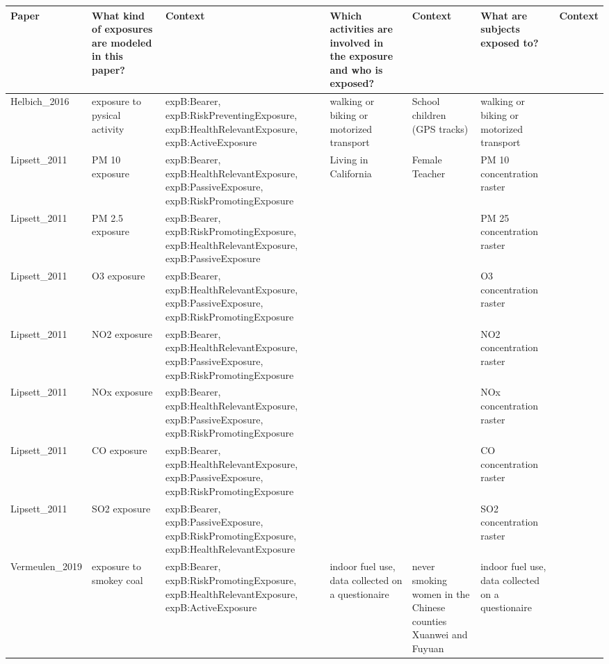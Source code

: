 \begin{tabular}{p{1cm}p{1cm}p{1cm}p{1cm}p{1cm}p{1cm}p{1cm}}
\toprule
          Paper & What kind of exposures are modeled in this paper? &                                                                                                         Context & Which activities are involved in the exposure and who is exposed? &                                                        Context &                     What are subjects exposed to? & Context \\
\midrule
Helbich\_2016 & exposure to pysical activity & expB:Bearer, expB:RiskPreventingExposure, expB:HealthRelevantExposure, expB:ActiveExposure & walking or biking or motorized transport & School children (GPS tracks) & walking or biking or motorized transport &  \\
Lipsett\_2011 & PM 10 exposure & expB:Bearer, expB:HealthRelevantExposure, expB:PassiveExposure, expB:RiskPromotingExposure & Living in California & Female Teacher & PM 10 concentration raster &  \\
Lipsett\_2011 & PM 2.5 exposure & expB:Bearer, expB:RiskPromotingExposure, expB:HealthRelevantExposure, expB:PassiveExposure &  &  & PM 25 concentration raster &  \\
Lipsett\_2011 & O3 exposure & expB:Bearer, expB:HealthRelevantExposure, expB:PassiveExposure, expB:RiskPromotingExposure &  &  & O3 concentration raster &  \\
Lipsett\_2011 & NO2 exposure & expB:Bearer, expB:HealthRelevantExposure, expB:PassiveExposure, expB:RiskPromotingExposure &  &  & NO2 concentration raster &  \\
Lipsett\_2011 & NOx exposure & expB:Bearer, expB:HealthRelevantExposure, expB:PassiveExposure, expB:RiskPromotingExposure &  &  & NOx concentration raster &  \\
Lipsett\_2011 & CO exposure & expB:Bearer, expB:HealthRelevantExposure, expB:PassiveExposure, expB:RiskPromotingExposure &  &  & CO concentration raster &  \\
Lipsett\_2011 & SO2 exposure & expB:Bearer, expB:PassiveExposure, expB:RiskPromotingExposure, expB:HealthRelevantExposure &  &  & SO2 concentration raster &  \\
Vermeulen\_2019 & exposure to smokey coal & expB:Bearer, expB:RiskPromotingExposure, expB:HealthRelevantExposure, expB:ActiveExposure & indoor fuel use, data collected on a questionaire & never smoking women in the Chinese counties Xuanwei and Fuyuan & indoor fuel use, data collected on a questionaire &  \\

\end{tabular}
